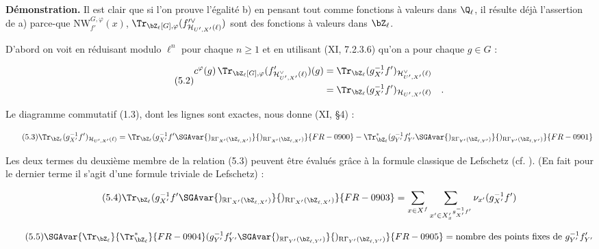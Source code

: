 \noindent
\textbf{Démonstration.} Il est clair que si l'on prouve l'égalité b) en pensant tout comme fonctions à valeurs dans $\Q_\ell$, il résulte déjà l'assertion de a) parce-que $\mathrm{NW}^{G,\varphi}_{f'}(x)$, $\Tr_{\bZ_\ell[G],\varphi}(f'^\vee_{\mathcal{H}_{U',X'}(\ell)})$ sont des fonctions à valeurs dans $\bZ_\ell$.

D'abord on voit en réduisant modulo $\ell^n$ pour chaque $n \geq 1$ et en utilisant (XI, 7.2.3.6) qu'on a pour chaque $g \in G$ :

\begin{equation}\tag{5.2}
\begin{aligned}
c^\varphi(g) \, \Tr_{\bZ_\ell[G],\varphi}(f'_{\mathcal{H}^\vee_{U',X'}(\ell)})(g)
&= \Tr_{\bZ_\ell}(g_{X'}^{-1}f')_{\mathcal{H}^\vee_{U',X'}(\ell)}\\
&= \Tr_{\bZ_\ell}(g_{X'}^{-1}f')_{\mathcal{H}_{U',X'}(\ell)} \quad .
\end{aligned}
\end{equation}

Le diagramme commutatif (1.3), dont les lignes sont exactes, nous donne (XI, \S4) :

\begin{equation}\tag{5.3}
\Tr_{\bZ_\ell}(g_{X'}^{-1}f')_{\mathcal{H}_{U',X'}(\ell)} = \Tr_{\bZ_\ell}(g_{X'}^{-1}f'\SGAvar{)_{\mathbb{R}\Gamma_{X'}(\bZ_{\ell,X'})}}{)_{\mathrm{R}\Gamma_{X'}(\bZ_{\ell,X'})}}{FR-0900} - \Tr^*_{\bZ_\ell}(g_{Y'}^{-1}f'_{Y'}\SGAvar{)_{\mathbb{R}\Gamma_{Y'}(\bZ_{\ell,Y'})}}{)_{\mathrm{R}\Gamma_{Y'}(\bZ_{\ell,Y'})}}{FR-0901}
\end{equation}

Les deux termes du deuxième membre de la relation (5.3) peuvent être évalués grâce à la formule classique de Lefschetz (cf. ). (En fait pour le dernier terme il s'agit d'une formule triviale de Lefschetz) :

\begin{equation}\tag{5.4}
\Tr_{\bZ_\ell}(g_{X'}^{-1}f'\SGAvar{)_{\mathbb{R}\Gamma_{X'}(\bZ_{\ell,X'})}}{)_{\mathrm{R}\Gamma_{X'}(\bZ_{\ell,X'})}}{FR-0903} = \sum_{x \in X^f} \sum_{x' \in {X'_x}^{g_{X'}^{-1}f'}} \nu_{x'}(g_{X'}^{-1}f')
\end{equation}

\begin{equation}\tag{5.5}
\SGAvar{\Tr_{\bZ_\ell}}{\Tr^*_{\bZ_\ell}}{FR-0904}(g_{Y'}^{-1}f'_{Y'}\SGAvar{)_{\mathbb{R}\Gamma_{Y'}(\bZ_{\ell,Y'})}}{)_{\mathrm{R}\Gamma_{Y'}(\bZ_{\ell,Y'})}}{FR-0905} = \text{nombre des points fixes de } g_{Y'}^{-1}f'_{Y'}
\end{equation}

